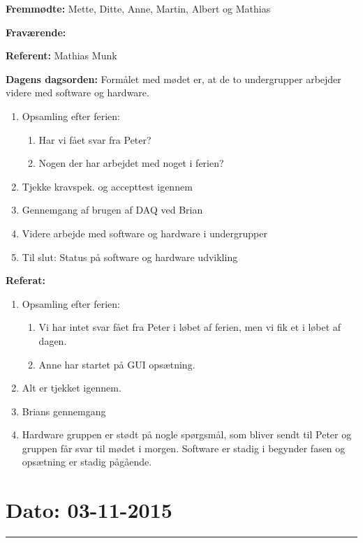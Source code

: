 \textbf{Fremmødte:} Mette, Ditte, Anne, Martin, Albert og Mathias 

\textbf{Fraværende:}

\textbf{Referent:} Mathias Munk

\textbf{Dagens dagsorden:}
\newline
Formålet med mødet er, at de to undergrupper arbejder videre med software og hardware.
\begin{enumerate}
\item Opsamling efter ferien:
\begin{enumerate}
\item Har vi fået svar fra Peter?
\item Nogen der har arbejdet med noget i ferien?
\end{enumerate}

\item Tjekke kravspek. og accepttest igennem

\item Gennemgang af brugen af DAQ ved Brian

\item Videre arbejde med software og hardware i undergrupper

\item Til slut: Status på software og hardware udvikling
\end{enumerate}

\textbf{Referat:}
\newline 
\begin{enumerate}
\item Opsamling efter ferien:
\begin{enumerate}
\item Vi har intet svar fået fra Peter i løbet af ferien, men vi fik et i løbet af dagen.
\item Anne har startet på GUI opsætning.
\end{enumerate}
\item Alt er tjekket igennem.
\item Brians gennemgang
\item Hardware gruppen er stødt på nogle spørgsmål, som bliver sendt til Peter og gruppen får svar til mødet i morgen. Software er stadig i begynder fasen og opsætning er stadig pågående.
\end{enumerate}


\section{Dato: 03-11-2015}
\hrule

